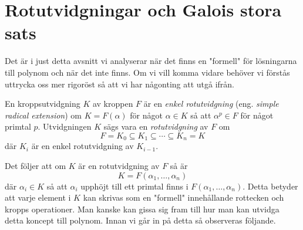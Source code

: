 \documentclass{article}
\theoremstyle{definition}
\begin{document}
\section{Rotutvidgningar och Galois stora sats}
Det är i just detta avsnitt vi analyserar när det finns en "formell" för lösningarna till polynom och när det inte finns. 
Om vi vill komma vidare behöver vi förstås uttrycka oss mer rigoröst så att vi har någonting att utgå ifrån.

\begin{mydef}{}{}
  En kroppsutvidgning $K$ av kroppen $F$ är en \textit{enkel rotutvidgning} (eng. \textit{simple radical extension}) om 
  $K = F(\alpha)$ för något $\alpha \in K$ så att $\alpha^p \in F$ för något primtal $p$. 
  Utvidgningen $K$ sägs vara en \textit{rotutvidgning} av $F$ om 
  \[F = K_0 \subseteq K_1 \subseteq \cdots \subseteq K_n = K \]
  där $K_i$ är en enkel rotutvidgning av $K_{i-1}$.
\end{mydef}
Det följer att om $K$ är en rotutvidgning av $F$ så är 
\[K = F(\alpha_1, \ldots, \alpha_n)\]
där $\alpha_i \in K$ så att $\alpha_i$ upphöjt till ett primtal finns i $F(\alpha_1, \ldots, \alpha_n)$. Detta betyder 
att varje element i $K$ kan skrivas som en "formell" innehållande rottecken och kropps operationer. Man kanske kan 
gissa sig fram till hur man kan utvidga detta koncept till polynom. Innan vi går in på detta så observeras följande.
\end{document}
